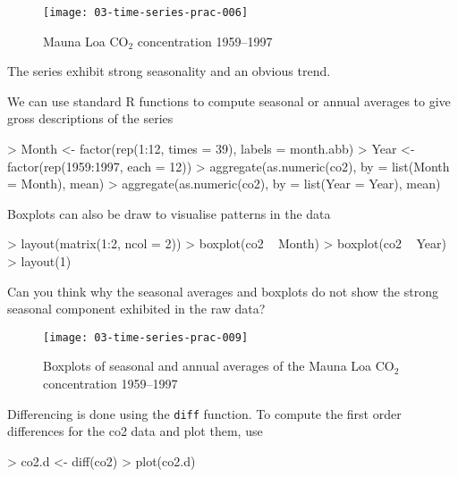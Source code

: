 \documentclass[a4paper,10pt]{article}
\newcommand{\R}{\textsf{R}\xspace}
\begin{document}
\begin{figure}[t]
\begin{center}
\texttt{[image: 03-time-series-prac-006]}
\caption{Mauna Loa $\mathrm{CO_2}$ concentration 1959--1997}
\end{center}
\end{figure}

The series exhibit strong seasonality and an obvious trend.

We can use standard \R functions to compute seasonal or annual averages to give gross descriptions of the series
\begin{Schunk}
\begin{Sinput}
> Month <- factor(rep(1:12, times = 39), labels = month.abb)
> Year <- factor(rep(1959:1997, each = 12))
> aggregate(as.numeric(co2), by = list(Month = Month), mean)
> aggregate(as.numeric(co2), by = list(Year = Year), mean)
\end{Sinput}
\end{Schunk}
Boxplots can also be draw to visualise patterns in the data
\begin{Schunk}
\begin{Sinput}
> layout(matrix(1:2, ncol = 2))
> boxplot(co2 ~ Month)
> boxplot(co2 ~ Year)
> layout(1)
\end{Sinput}
\end{Schunk}
Can you think why the seasonal averages and boxplots do not show the strong seasonal component exhibited in the raw data?
\begin{figure}[t]
\begin{center}
\texttt{[image: 03-time-series-prac-009]}
\caption{Boxplots of seasonal and annual averages of the Mauna Loa $\mathrm{CO_2}$ concentration 1959--1997}
\end{center}
\end{figure}
%
Differencing is done using the \texttt{diff} function. To compute the first order differences for the co2 data and plot them, use
\begin{Schunk}
\begin{Sinput}
> co2.d <- diff(co2)
> plot(co2.d)
\end{Sinput}
\end{Schunk}
\end{document}
